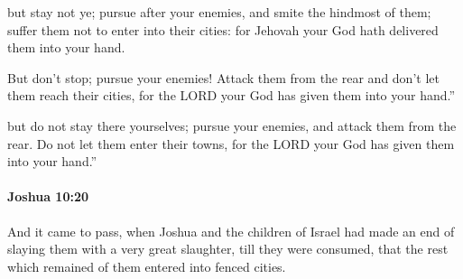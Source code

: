 			\begin{versebox}
					\item[BHS] 
					\item[ASV] but stay not ye; pursue after your enemies, and smite the hindmost of them; suffer them not to enter into their cities: for Jehovah your God hath delivered them into your hand.
					\item[NIV] But don’t stop; pursue your enemies! Attack them from the rear and don’t let them reach their cities, for the LORD your God has given them into your hand.”
					\item[NRSV] but do not stay there yourselves; pursue your enemies, and attack them from the rear. Do not let them enter their towns, for the LORD your God has given them into your hand.”
			\end{versebox}

		\paragraph{Joshua 10:20} %
			\label{JOSHUA-10-20}

			And it came to pass, when Joshua and the children of Israel had made an end of slaying them with a very great slaughter, till they were consumed, that the rest which remained of them entered into fenced cities.

